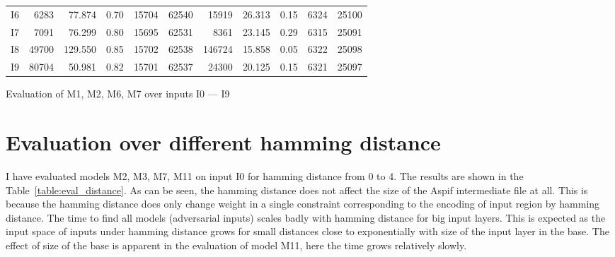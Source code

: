 \documentclass[
    digital,
    color,
    oneside,
    sansbold,
    lot,
    nolof
]{fithesis}
\begin{document}
{\begin{tabular}{r | R R R R R | R R R R R}
        I6 &  6283 & 77.874 & 0.70 & 15704 & 62540 & 15919 & 26.313 & 0.15 & 6324 & 25100 \\
        I7 &  7091 & 76.299 & 0.80 & 15695 & 62531 &  8361 & 23.145 & 0.29 & 6315 & 25091 \\
        I8 & 49700 &129.550 & 0.85 & 15702 & 62538 &146724 & 15.858 & 0.05 & 6322 & 25098 \\
        I9 & 80704 & 50.981 & 0.82 & 15701 & 62537 & 24300 & 20.125 & 0.15 & 6321 & 25097 \\ \bottomrule
    \end{tabular}
    \caption{Evaluation of M1, M2, M6, M7 over inputs I0 --- I9}%
    \caption*{\centering%
        $\#M$ number of adv.\ inputs,
        $T_M$ time to all adv.\ inputs [sec], $T_1$ time to 1st adv.\ input [sec]
        \\
        $N_r$ number of lines (approx.\ rules) of Aspif,
        $N_l$ number of words (approx.\ literals) of Aspif}%
    \label{table:eval_inputs}
}

\section{Evaluation over different hamming distance}

I have evaluated models M2, M3, M7, M11 on input I0 for hamming distance
from 0 to 4. The results are shown in the Table~\ref{table:eval_distance}.
As can be seen, the hamming distance does not affect the size of the Aspif
intermediate file at all. This is because the hamming distance does only change
weight in a single constraint corresponding to the encoding of input region
by hamming distance.
The time to find all models (adversarial inputs) scales badly with hamming
distance for big input layers. This is expected as the input space
of inputs under hamming distance grows for small distances close
to exponentially with size of the input layer in the base. The effect
of size of the base is apparent in the evaluation of model M11,
here the time grows relatively slowly.
\end{document}
